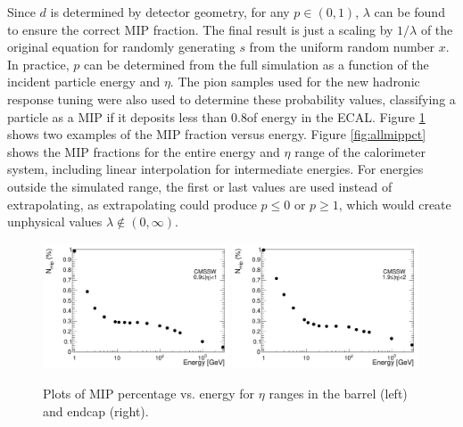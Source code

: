 Since $d$ is determined by detector geometry, for any $p \in (0,1)$, $\lambda$ can be found to ensure the correct MIP fraction. The final result is just a scaling by $1/\lambda$ of the original equation for randomly generating $s$ from the uniform random number $x$. In practice, $p$ can be determined from the full simulation as a function of the incident particle energy and $\eta$. The pion samples used for the new hadronic response tuning were also used to determine these probability values, classifying a particle as a MIP if it deposits less than 0.8\GeV of energy in the ECAL. Figure \ref{fig:mippct} shows two examples of the MIP fraction versus energy. Figure \ref{fig:allmippct} shows the MIP fractions for the entire energy and $\eta$ range of the calorimeter system, including linear interpolation for intermediate energies. For energies outside the simulated range, the first or last values are used instead of extrapolating, as extrapolating could produce $p \leq 0$ or $p \geq 1$, which would create unphysical values $\lambda \not\in (0,\infty)$.

\begin{figure}[hbtp]
\begin{center}
\includegraphics[width=0.49\textwidth]{figures/fs_plot_mip_ieta10.pdf}
\includegraphics[width=0.49\textwidth]{figures/fs_plot_mip_ieta20.pdf}
\caption{Plots of MIP percentage vs. energy for $\eta$ ranges in the barrel (left) and endcap (right).}
\label{fig:mippct}
\end{center}
\end{figure}

